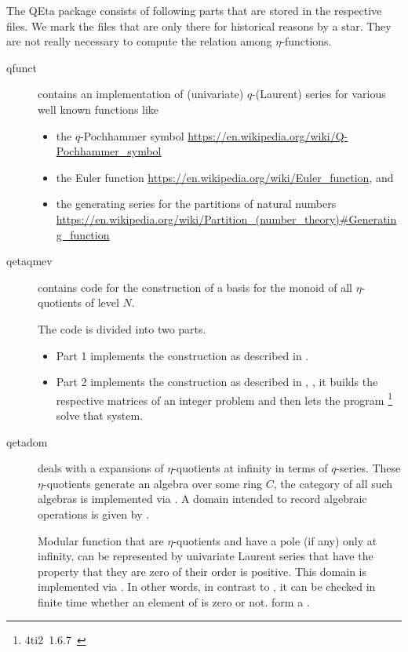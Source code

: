 \documentclass{article}
\begin{document}
The QEta package consists of following parts that are stored in the
respective  files. We mark the files that are only
there for historical reasons by a star. They are not really necessary
to compute the relation among $\eta$-functions.
\begin{description}
\item[qfunct] contains an implementation of (univariate) $q$-(Laurent)
  series for various well known functions like
  \begin{itemize}
  \item the $q$-Pochhammer symbol
    \url{https://en.wikipedia.org/wiki/Q-Pochhammer_symbol}
  \item the Euler function
    \url{https://en.wikipedia.org/wiki/Euler_function}, and
  \item the generating series for the partitions of natural numbers
    \url{https://en.wikipedia.org/wiki/Partition_(number_theory)#Generating_function}
  \end{itemize}

\item[qetaqmev] contains code for the construction of a basis for the
  monoid of all $\eta$-quotients of level $N$.

  The code is divided into two parts.
  \begin{itemize}
  \item Part 1 implements the construction as described in
    \cite{Radu:RamanujanKolberg:2015}.
  \item Part 2 implements the construction as described in
    \cite{Hemmecke+Radu:EtaRelations:2018}, \ie, it builds the
    respective matrices of an integer problem and then lets the
    program \footnote{4ti2~1.6.7~\cite{4ti2}} solve that
    system.
  \end{itemize}

\item[qetadom] deals with a expansions of $\eta$-quotients at infinity
  in terms of $q$-series. These $\eta$-quotients generate an algebra
  over some ring $C$, the category of all such algebras is implemented
  via . A domain intended to record algebraic
  operations is given by .

  Modular function that are $\eta$-quotients and have a pole (if any)
  only at infinity, can be represented by univariate Laurent series
  that have the property that they are zero of their order is
  positive. This domain is implemented via . In
  other words, in contrast to , it
  can be checked in finite time whether an element of
   is zero or not. 
  form a .


\end{description}
\end{document}
